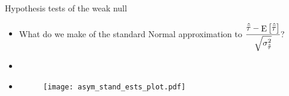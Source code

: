 \documentclass[table, xcolor={dvipsnames}, 9pt]{beamer}
\theoremstyle{newstyle}
\DeclareMathOperator{\E}{\mathrm{E}}
\begin{document}
\begin{frame}{Hypothesis tests of the weak null}
\begin{itemize}
\item What do we make of the standard Normal approximation to $\cfrac{\hat{\bar{\tau}} - \E\left[\hat{\bar{\tau}}\right]}{\sqrt{\sigma^2_{\hat{\bar{\tau}}}}}$? \pause 
\item[]	
\item[]
\begin{figure}[H]
\texttt{[image: asym\_stand\_ests\_plot.pdf]}
\end{figure}
\end{itemize}
\end{frame}
\end{document}
